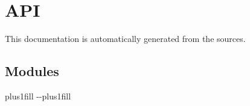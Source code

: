 \documentclass[letterpaper,10pt,english]{sphinxmanual}
\begin{document}
\chapter{API}
\label{\detokenize{api:api}}\label{\detokenize{api::doc}}
\sphinxAtStartPar
This documentation is automatically generated from the sources.


\section{Modules}
\label{\detokenize{api:modules}}

\begin{savenotes}
\sphinxatlongtablestart
\sphinxthistablewithglobalstyle
\sphinxthistablewithnovlinesstyle
\makeatletter
  \LTleft \@totalleftmargin plus1fill
  \LTright\dimexpr\columnwidth-\@totalleftmargin-\linewidth\relax plus1fill
\makeatother
\begin{longtable}{}
\sphinxtoprule
\endfirsthead

\\
\sphinxtoprule
\endhead

\sphinxbottomrule
{}\\
\endfoot

\endlastfoot
\sphinxtableatstartofbodyhook


\end{longtable}
\end{savenotes}
\end{document}
